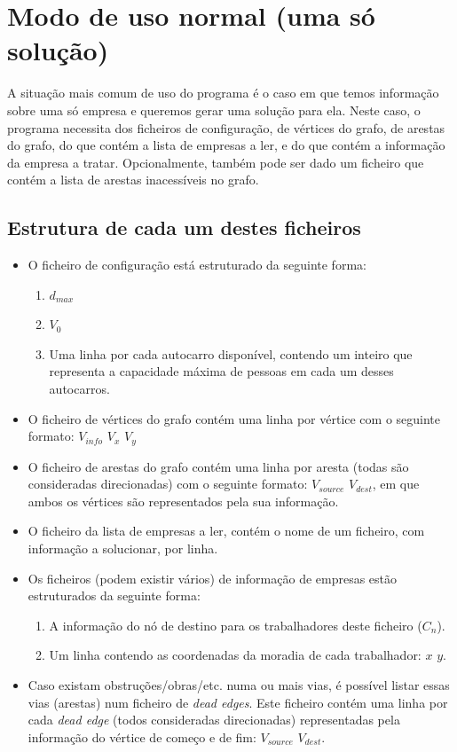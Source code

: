 \documentclass{report}
\begin{document}
 \section{Modo de uso normal (uma só solução)}
  A situação mais comum de uso do programa é o caso em que temos informação sobre
  uma só empresa e queremos gerar uma solução para ela. Neste caso, o programa
  necessita dos ficheiros de configuração, de vértices do grafo, de arestas do
  grafo, do que contém a lista de empresas a ler, e do que contém a informação
  da empresa a tratar. Opcionalmente, também pode ser dado um ficheiro que
  contém a lista de arestas inacessíveis no grafo.
  \subsection{Estrutura de cada um destes ficheiros}
  \begin{itemize}
    \item O ficheiro de configuração está estruturado da seguinte forma:
    \begin{enumerate}
      \item $d_{max}$
      \item $V_0$
      \item Uma linha por cada autocarro disponível, contendo um inteiro que
        representa a capacidade máxima de pessoas em cada um desses autocarros.
    \end{enumerate}

    \item O ficheiro de vértices do grafo contém uma linha por vértice com o seguinte
    formato: $V_{info}$ $V_x$ $V_y$

    \item O ficheiro de arestas do grafo contém uma linha por aresta (todas são
      consideradas direcionadas) com o seguinte formato: $V_{source}$ $V_{dest}$,
      em que ambos os vértices são representados pela sua informação.

    \item O ficheiro da lista de empresas a ler, contém o nome de um ficheiro,
      com informação a solucionar, por linha.

    \item Os ficheiros (podem existir vários) de informação de empresas estão
      estruturados da seguinte forma:
      \begin{enumerate}
        \item A informação do nó de destino para os trabalhadores deste ficheiro
          ($C_n$).
        \item Um linha contendo as coordenadas da moradia de cada trabalhador:
          $x$ $y$.
      \end{enumerate}

    \item Caso existam obstruções/obras/etc. numa ou mais vias, é possível listar
      essas vias (arestas) num ficheiro de \textit{dead edges}. Este ficheiro contém
      uma linha por cada \textit{dead edge} (todos consideradas direcionadas)
      representadas pela informação do vértice de começo e de fim:
      $V_{source}$ $V_{dest}$.
  \end{itemize}
\end{document}
